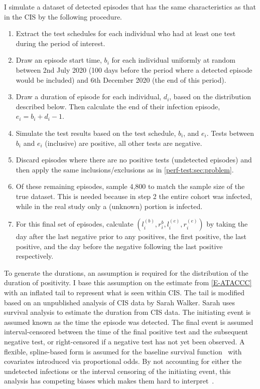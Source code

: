 \documentclass[thesis.tex]{subfiles}
\begin{document}
I simulate a dataset of detected episodes that has the same characteristics as that in the CIS by the following procedure.
\begin{enumerate}
    \item Extract the test schedules for each individual who had at least one test during the period of interest.
    \item Draw an episode start time, $b_i$ for each individual uniformly at random between 2nd July 2020 (100 days before the period where a detected episode would be included) and 6th December 2020 (the end of this period).
    \item Draw a duration of episode for each individual, $d_i$, based on the distribution described below. Then calculate the end of their infection episode, $e_i = b_i + d_i - 1$.
    \item Simulate the test results based on the test schedule, $b_i$, and $e_i$. Tests between $b_i$ and $e_i$ (inclusive) are positive, all other tests are negative.
    \item Discard episodes where there are no positive tests (\ie undetected episodes) and then apply the same inclusions/exclusions as in \cref{perf-test:sec:problem}.
    \item Of these remaining episodes, sample 4,800 to match the sample size of the true dataset. This is needed because in step 2 the entire cohort was infected, while in the real study only a (unknown) portion is infected.
    \item For this final set of episodes, calculate $(l_i^{(b)}, r_i^{b}, l_i^{(e)}, r_i^{(e)})$ by taking the day after the last negative prior to any positives, the first positive, the last positive, and the day before the negative following the last positive respectively.
\end{enumerate}

To generate the durations, an assumption is required for the distribution of the duration of positivity.
I base this assumption on the estimate from \cref{E-ATACCC} with an inflated tail to represent what is seen within CIS.
The tail is modified based on an unpublished analysis of CIS data by Sarah Walker.
Sarah uses survival analysis to estimate the duration from CIS data.
The initiating event is assumed known as the time the episode was detected.
The final event is assumed interval-censored between the time of the final positive test and the subsequent negative test, or right-censored if a negative test has not yet been observed.
A flexible, spline-based form is assumed for the baseline survival function~\autocite{roystonSTPM,roystonFlexible} with covariates introduced via proportional odds.
By not accounting for either the undetected infections or the interval censoring of the initiating event, this analysis has competing biases which makes them hard to interpret~\autocite{cisMethodsONS}.
\end{document}
